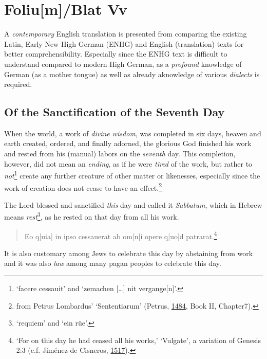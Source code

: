 \documentclass[
]{article}
\author{Dietmar Gerald Schrausser}
\date{09.05.2026}
\begin{document}
\hypertarget{foliumblat-vv}{%
\section{Foliu{[}m{]}/Blat Vv}\label{foliumblat-vv}}

A \emph{contemporary} English translation is presented from comparing
the existing Latin, Early New High German (ENHG) and English
(translation) texts for better comprehensibility. Especially since the
ENHG text is difficult to understand compared to modern High German, as
a \emph{profound} knowledge of German (as a mother tongue) as well as
already aknowledge of various \emph{dialects} is required.

\hypertarget{of-the-sanctification-of-the-seventh-day}{%
\subsection{Of the Sanctification of the Seventh
Day}\label{of-the-sanctification-of-the-seventh-day}}

When the world, a work of \emph{divine wisdom}, was completed in six
days, heaven and earth created, ordered, and finally adorned, the
glorious God finished his work and rested from his (manual) labors on
the \emph{seventh} day. This completion, however, did not mean an
\emph{ending}, as if he were \emph{tired} of the work, but rather to
\emph{not}\footnote{`facere cessauit' and `zemachen {[}\ldots{]} nit
  vergange{[}n{]}'.} create any further creature of other matter or
likenesses, especially since the work of creation does not cease to have
an effect.\footnote{from Petrus Lombardus' `Sententiarum' (Petrus,
  \href{https://doi.org/10.3931/e-rara-18241}{1484}, Book II, Chapter7).}

The Lord blessed and sanctified \emph{this} day and called it
\emph{Sabbatum}, which in Hebrew means \emph{rest}\footnote{`requiem'
  and `ein rüe'.}, as he rested on that day from all his work.

\begin{quote}
Eo q{[}uia{]} in ipso cessauerat ab om{[}n{]}i opere q{[}uo{]}d
patrarat.\footnote{`For on this day he had ceased all his works,'
  `Vulgate', a variation of Genesis 2:3 (c.f. Jiménez de Cisneros,
  \href{https://doi.org/10.3931/e-rara-46695}{1517}).}
\end{quote}

It is also customary among Jews to celebrate this day by abstaining from
work and it was also \emph{law} among many pagan peoples to celebrate
this day.
\end{document}
